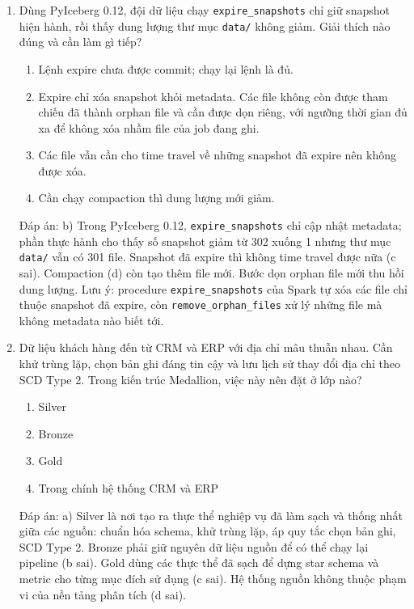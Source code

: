 \documentclass[12pt]{article}
\begin{document}
\begin{enumerate}[label=\textbf{\arabic*.}, leftmargin=1.6em, itemsep=1.2em]
\item Dùng PyIceberg 0.12, đội dữ liệu chạy \texttt{expire\_snapshots} chỉ giữ snapshot hiện hành, rồi thấy dung lượng thư mục \texttt{data/} không giảm. Giải thích nào đúng và cần làm gì tiếp?

\begin{enumerate}[label=\alph*), leftmargin=2.2em, itemsep=1pt]
    \item Lệnh expire chưa được commit; chạy lại lệnh là đủ.
    \item Expire chỉ xóa snapshot khỏi metadata. Các file không còn được tham chiếu đã thành orphan file và cần được dọn riêng, với ngưỡng thời gian đủ xa để không xóa nhầm file của job đang ghi.
    \item Các file vẫn cần cho time travel về những snapshot đã expire nên không được xóa.
    \item Cần chạy compaction thì dung lượng mới giảm.
\end{enumerate}
\begin{guidelinebox}{Đáp án: b)}
Trong PyIceberg 0.12, \texttt{expire\_snapshots} chỉ cập nhật metadata; phần thực hành cho thấy số snapshot giảm từ 302 xuống 1 nhưng thư mục \texttt{data/} vẫn có 301 file. Snapshot đã expire thì không time travel được nữa (c sai). Compaction (d) còn tạo thêm file mới. Bước dọn orphan file mới thu hồi dung lượng. Lưu ý: procedure \texttt{expire\_snapshots} của Spark tự xóa các file chỉ thuộc snapshot đã expire, còn \texttt{remove\_orphan\_files} xử lý những file mà không metadata nào biết tới.
\end{guidelinebox}

\item Dữ liệu khách hàng đến từ CRM và ERP với địa chỉ mâu thuẫn nhau. Cần khử trùng lặp, chọn bản ghi đáng tin cậy và lưu lịch sử thay đổi địa chỉ theo SCD Type 2. Trong kiến trúc Medallion, việc này nên đặt ở lớp nào?

\begin{enumerate}[label=\alph*), leftmargin=2.2em, itemsep=1pt]
    \item Silver
    \item Bronze
    \item Gold
    \item Trong chính hệ thống CRM và ERP
\end{enumerate}
\begin{guidelinebox}{Đáp án: a)}
Silver là nơi tạo ra thực thể nghiệp vụ đã làm sạch và thống nhất giữa các nguồn: chuẩn hóa schema, khử trùng lặp, áp quy tắc chọn bản ghi, SCD Type 2. Bronze phải giữ nguyên dữ liệu nguồn để có thể chạy lại pipeline (b sai). Gold dùng các thực thể đã sạch để dựng star schema và metric cho từng mục đích sử dụng (c sai). Hệ thống nguồn không thuộc phạm vi của nền tảng phân tích (d sai).
\end{guidelinebox}


\end{enumerate}
\end{document}
